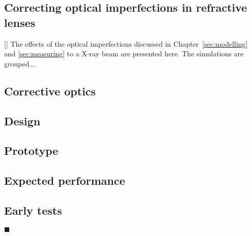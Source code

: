 \begin{refsection}
\chapter{Correcting optical imperfections in refractive lenses}
\label{sec:corrections}

[\cite{Seiboth2017,Seiboth2020}]
The effects of the optical imperfections discussed in Chapter~\ref{sec:modelling} and \ref{sec:measuring} to a X-ray beam are presented here. The simulations are grouped...
\section{Corrective optics}
\section{Design}\label{sec:design}

\section{Prototype}\label{sec:prototype}

\section{Expected performance}\label{sec:performance}

\section{Early tests}\label{sec:prototype_testing}



$\blacksquare$
\printbibliography[heading=subbibliography]
\end{refsection}
